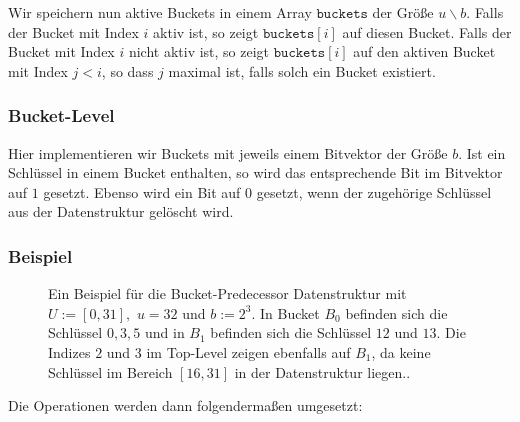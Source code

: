 Wir speichern nun aktive Buckets in einem Array $\texttt{buckets}$ der Größe $u \backslash b$. Falls der Bucket mit Index $i$ aktiv ist, so zeigt $\texttt{buckets}[i]$ auf diesen Bucket. Falls der Bucket mit Index $i$ nicht aktiv ist, so zeigt $\texttt{buckets}[i]$ auf den aktiven Bucket mit Index $j < i$, so dass $j$ maximal ist, falls solch ein Bucket existiert.

\subsubsection{Bucket-Level}

Hier implementieren wir Buckets mit jeweils einem Bitvektor der Größe $b$. Ist ein Schlüssel in einem Bucket enthalten, so wird das entsprechende Bit im Bitvektor auf $1$ gesetzt. Ebenso wird ein Bit auf $0$ gesetzt, wenn der zugehörige Schlüssel aus der Datenstruktur gelöscht wird.

\subsubsection{Beispiel}

\begin{figure}
	\centering
	\caption{Ein Beispiel für die Bucket-Predecessor Datenstruktur mit $U := [0, 31],$ $u = 32$ und $b := 2^3$. In Bucket $B_0$ befinden sich die Schlüssel $0, 3, 5$ und in $B_1$ befinden sich die Schlüssel $12$ und $13$. Die Indizes $2$ und $3$ im Top-Level zeigen ebenfalls auf $B_1$, da keine Schlüssel im Bereich $[16, 31]$ in der Datenstruktur liegen..}
	\label{bucketpred}
\end{figure}
Die Operationen werden dann folgendermaßen umgesetzt:

